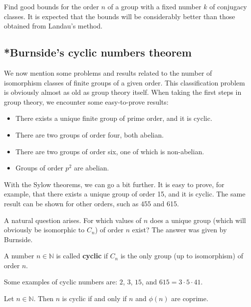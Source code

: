 
\begin{problem}[Brauer]
Find good bounds for the order $n$ of a group with a fixed number $k$ of conjugacy classes. It is expected that the bounds will be considerably better than those obtained from Landau's method.
\end{problem}

\subsection{*Burnside's cyclic numbers theorem}

We now mention some problems and results related to the number of isomorphism classes of finite groups of a given order. This classification problem is obviously almost as old as group theory itself. When taking the first steps in group theory, we encounter some easy-to-prove results:
\begin{itemize}
    \item There exists a unique finite group of prime order, and it is cyclic.
    \item There are two groups of order four, both abelian.
    \item There are two groups of order six, one of which is non-abelian.
    \item Groups of order $p^2$ are abelian.
\end{itemize}

With the Sylow theorems, we can go a bit further. It is easy to prove, for example, that there exists a unique group of order 15, and it is cyclic. The same result can be shown for other orders, such as 455 and 615.

A natural question arises. For which values of $n$ does a unique group (which will obviously be isomorphic to $C_n$) of order $n$ exist? The answer was given by Burnside.

\begin{definition}
A number $n\in\mathbb{N}$ is called \textbf{cyclic} if $C_n$ is the only group (up to isomorphism) of order $n$.
\end{definition}

Some examples of cyclic numbers are: $2$, $3$, $15$, and $615=3\cdot 5\cdot 41$.

\begin{theorem}[Burnside]
    Let $n\in\mathbb{N}$. Then $n$ is cyclic if and only if $n$ and $\phi(n)$ are coprime.
\end{theorem}

